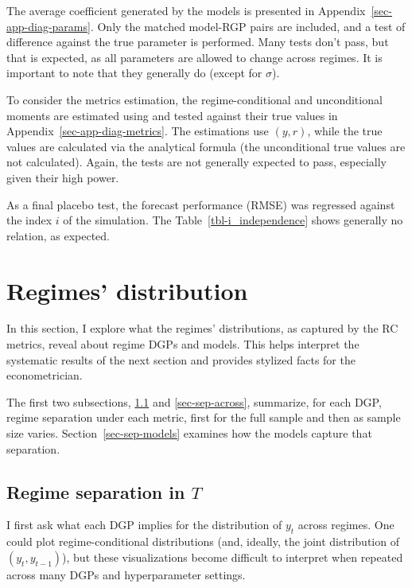 \documentclass[
  letterpaper,
  DIV=11,
  numbers=noendperiod]{scrartcl}
\numberwithin{equation}{section}
\numberwithin{table}{section}
\numberwithin{figure}{section}
\let\oldsection\section
\renewcommand\section{\clearpage\oldsection}
\begin{document}
The average coefficient generated by the models is presented in
Appendix~\ref{sec-app-diag-params}. Only the matched model-RGP pairs are
included, and a test of difference against the true parameter is
performed. Many tests don't pass, but that is expected, as all
parameters are allowed to change across regimes. It is important to note
that they generally do (except for \(\sigma\)).

To consider the metrics estimation, the regime-conditional and
unconditional moments are estimated using and tested against their true
values in Appendix~\ref{sec-app-diag-metrics}. The estimations use
\((y, r)\), while the true values are calculated via the analytical
formula (the unconditional true values are not calculated). Again, the
tests are not generally expected to pass, especially given their high
power.

As a final placebo test, the forecast performance (RMSE) was regressed
against the index \(i\) of the simulation. The
Table~\ref{tbl-i_independence} shows generally no relation, as expected.

\section{Regimes' distribution}\label{sec-sep}

In this section, I explore what the regimes' distributions, as captured
by the RC metrics, reveal about regime DGPs and models. This helps
interpret the systematic results of the next section and provides
stylized facts for the econometrician.

The first two subsections, \ref{sec-sep-in} and \ref{sec-sep-across},
summarize, for each DGP, regime separation under each metric, first for
the full sample and then as sample size varies.
Section~\ref{sec-sep-models} examines how the models capture that
separation.

\subsection{\texorpdfstring{Regime separation in
\(T\)}{Regime separation in T}}\label{sec-sep-in}

I first ask what each DGP implies for the distribution of \(y_t\) across
regimes. One could plot regime-conditional distributions (and, ideally,
the joint distribution of \((y_t, y_{t-1})\)), but these visualizations
become difficult to interpret when repeated across many DGPs and
hyperparameter settings.
\end{document}

